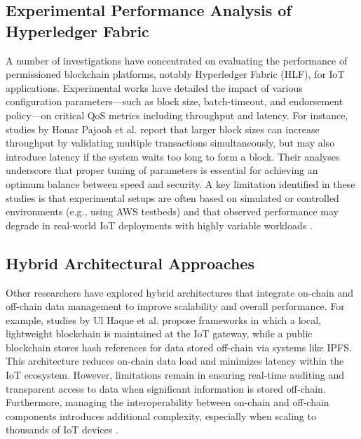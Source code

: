 \documentclass[12pt,onecolumn]{IEEEtran} %
\begin{document}
\subsection*{Experimental Performance Analysis of Hyperledger Fabric}
A number of investigations have concentrated on evaluating the performance of permissioned blockchain platforms, notably Hyperledger Fabric (HLF), for IoT applications. Experimental works \cite{pajooh2022experimentalperformanceanalysis} have detailed the impact of various configuration parameters---such as block size, batch-timeout, and endorsement policy---on critical QoS metrics including throughput and latency. For instance, studies by Honar Pajooh et al. \cite{pajooh2022experimentalperformanceanalysis} report that larger block sizes can increase throughput by validating multiple transactions simultaneously, but may also introduce latency if the system waits too long to form a block. Their analyses underscore that proper tuning of parameters is essential for achieving an optimum balance between speed and security. A key limitation identified in these studies is that experimental setups are often based on simulated or controlled environments (e.g., using AWS testbeds) and that observed performance may degrade in real-world IoT deployments with highly variable workloads \cite{pajooh2022experimentalperformanceanalysis}.

\subsection*{Hybrid Architectural Approaches}
Other researchers have explored hybrid architectures that integrate on-chain and off-chain data management to improve scalability and overall performance. For example, studies by Ul Haque et al. \cite{haque2024ascalableblockchain} propose frameworks in which a local, lightweight blockchain is maintained at the IoT gateway, while a public blockchain stores hash references for data stored off-chain via systems like IPFS. This architecture reduces on-chain data load and minimizes latency within the IoT ecosystem. However, limitations remain in ensuring real-time auditing and transparent access to data when significant information is stored off-chain. Furthermore, managing the interoperability between on-chain and off-chain components introduces additional complexity, especially when scaling to thousands of IoT devices \cite{haque2024ascalableblockchain}.
\end{document}
